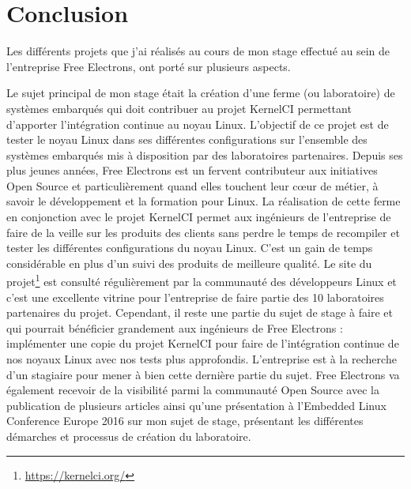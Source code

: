 \chapter*{Conclusion}

Les différents projets que j'ai réalisés au cours de mon stage effectué au sein de l'entreprise Free Electrons, ont porté sur plusieurs aspects.

Le sujet principal de mon stage était la création d'une ferme (ou laboratoire) de systèmes embarqués qui doit contribuer au projet KernelCI permettant d'apporter l'intégration continue au noyau Linux. L'objectif de ce projet est de tester le noyau Linux dans ses différentes configurations sur l'ensemble des systèmes embarqués mis à disposition par des laboratoires partenaires. Depuis ses plus jeunes années, Free Electrons est un fervent contributeur aux initiatives Open Source et particulièrement quand elles touchent leur c\oe{}ur de métier, à savoir le développement et la formation pour Linux. La réalisation de cette ferme en conjonction avec le projet KernelCI permet aux ingénieurs de l'entreprise de faire de la veille sur les produits des clients sans perdre le temps de recompiler et tester les différentes configurations du noyau Linux. C'est un gain de temps considérable en plus d'un suivi des produits de meilleure qualité. Le site du projet\footnote{\url{https://kernelci.org/}} est consulté régulièrement par la communauté des développeurs Linux et c'est une excellente vitrine pour l'entreprise de faire partie des 10 laboratoires partenaires du projet. Cependant, il reste une partie du sujet de stage à faire et qui pourrait bénéficier grandement aux ingénieurs de Free Electrons : implémenter une copie du projet KernelCI pour faire de l'intégration continue de nos noyaux Linux avec nos tests plus approfondis. L'entreprise est à la recherche d'un stagiaire pour mener à bien cette dernière partie du sujet. Free Electrons va également recevoir de la visibilité parmi la communauté Open Source avec la publication de plusieurs articles ainsi qu'une présentation à l'Embedded Linux Conference Europe 2016 sur mon sujet de stage, présentant les différentes démarches et processus de création du laboratoire.

